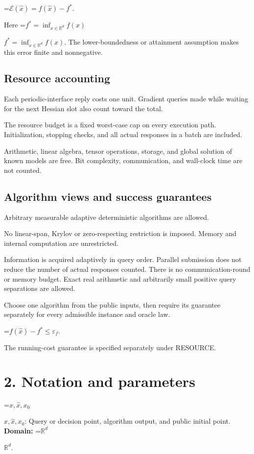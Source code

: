 \documentclass[10pt,a4paper]{article}
\newcommand{\AtlasMath}[1]{\par\begingroup\centering\setbox0=\hbox{$\displaystyle #1$}\ifdim\wd0>1.4\linewidth\typeout{ATLAS WIDE FORMULA: \the\wd0}\fi\ifdim\wd0>\linewidth\resizebox{\linewidth}{!}{\box0}\else\box0\fi\par\endgroup}
\newcommand{\AtlasInlineMath}[1]{\begingroup\setbox0=\hbox{$#1$}\ifdim\wd0>.4\linewidth\endgroup\AtlasMath{#1}\else\endgroup$#1$\fi}
\begin{document}
\AtlasMath{\mathcal{E}(\widehat{x})=f(\widehat{x})-f^*.}


Here \AtlasInlineMath{f^*=\inf_{x\in \mathbb{R}^d}f(x)}. The lower-boundedness or attainment assumption makes this error finite and nonnegative.

\subsection{Resource accounting}
Each periodic-interface reply costs one unit. Gradient queries made while waiting for the next Hessian slot also count toward the total.

The resource budget is a fixed worst-case cap on every execution path. Initialization, stopping checks, and all actual responses in a batch are included.

Arithmetic, linear algebra, tensor operations, storage, and global solution of known models are free. Bit complexity, communication, and wall-clock time are not counted.

\subsection{Algorithm views and success guarantees}
Arbitrary measurable adaptive deterministic algorithms are allowed.

No linear-span, Krylov or zero-respecting restriction is imposed. Memory and internal computation are unrestricted.

Information is acquired adaptively in query order. Parallel submission does not reduce the number of actual responses counted. There is no communication-round or memory budget. Exact real arithmetic and arbitrarily small positive query separations are allowed.

Choose one algorithm from the public inputs, then require its guarantee separately for every admissible instance and oracle law.


\AtlasMath{f(\widehat{x})-f^*\le \varepsilon_f.}


The running-cost guarantee is specified separately under RESOURCE.

\section{2. Notation and parameters}
\AtlasInlineMath{x,\widehat{x},x_0}: Query or decision point, algorithm output, and public initial point. \textbf{Domain:} \AtlasInlineMath{\mathbb{R}^d}.
\end{document}
